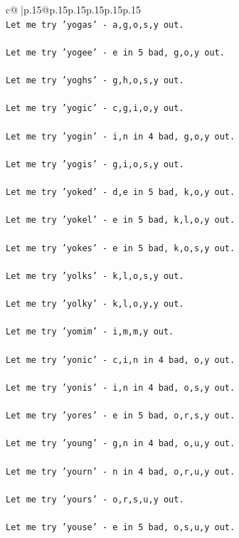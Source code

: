 \documentclass{article}
\begin{document}
{\begin{supertabular}{c@{$\;$}|p{.15\linewidth}@{}p{.15\linewidth}p{.15\linewidth}p{.15\linewidth}p{.15\linewidth}p{.15\linewidth}}
{{{\\ 
\texttt{Let me try 'yogas' {-} a,g,o,s,y out. } \\
\\ 
\texttt{Let me try 'yogee' {-} e in 5 bad, g,o,y out. } \\
\\ 
\texttt{Let me try 'yoghs' {-} g,h,o,s,y out. } \\
\\ 
\texttt{Let me try 'yogic' {-} c,g,i,o,y out. } \\
\\ 
\texttt{Let me try 'yogin' {-} i,n in 4 bad, g,o,y out. } \\
\\ 
\texttt{Let me try 'yogis' {-} g,i,o,s,y out. } \\
\\ 
\texttt{Let me try 'yoked' {-} d,e in 5 bad, k,o,y out. } \\
\\ 
\texttt{Let me try 'yokel' {-} e in 5 bad, k,l,o,y out. } \\
\\ 
\texttt{Let me try 'yokes' {-} e in 5 bad, k,o,s,y out. } \\
\\ 
\texttt{Let me try 'yolks' {-} k,l,o,s,y out. } \\
\\ 
\texttt{Let me try 'yolky' {-} k,l,o,y,y out. } \\
\\ 
\texttt{Let me try 'yomim' {-} i,m,m,y out. } \\
\\ 
\texttt{Let me try 'yonic' {-} c,i,n in 4 bad, o,y out. } \\
\\ 
\texttt{Let me try 'yonis' {-} i,n in 4 bad, o,s,y out. } \\
\\ 
\texttt{Let me try 'yores' {-} e in 5 bad, o,r,s,y out. } \\
\\ 
\texttt{Let me try 'young' {-} g,n in 4 bad, o,u,y out. } \\
\\ 
\texttt{Let me try 'yourn' {-} n in 4 bad, o,r,u,y out. } \\
\\ 
\texttt{Let me try 'yours' {-} o,r,s,u,y out. } \\
\\ 
\texttt{Let me try 'youse' {-} e in 5 bad, o,s,u,y out. } \\
}}}
\end{supertabular}}
\end{document}
